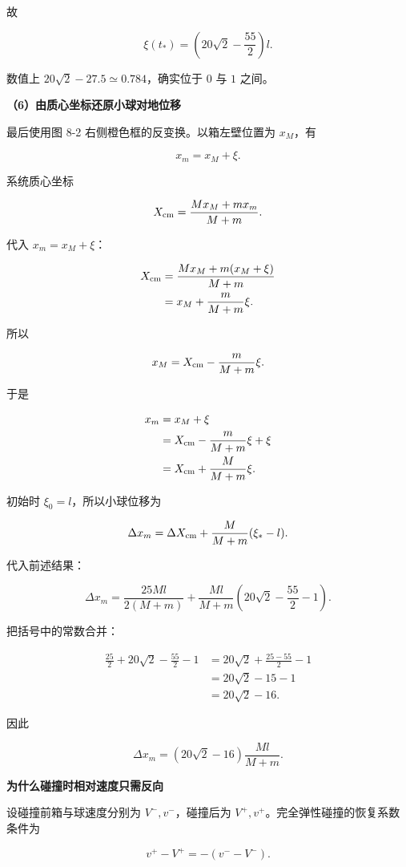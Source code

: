 \documentclass[12pt,a4paper,UTF8]{ctexart}
\begin{document}
故

\[
\boxed{
\xi(t_*)=\left(20\sqrt2-\frac{55}{2}\right)l
}.
\]

数值上 \(20\sqrt2-27.5\simeq0.784\)，确实位于 \(0\) 与 \(1\) 之间。

\textbf{（6）由质心坐标还原小球对地位移}

最后使用图 8-2 右侧橙色框的反变换。以箱左壁位置为 \(x_M\)，有

\[x_m=x_M+\xi.\]

系统质心坐标

\[
X_{\rm cm}=\frac{Mx_M+mx_m}{M+m}.
\]

代入 \(x_m=x_M+\xi\)：

\[
\begin{aligned}
X_{\rm cm}
&=\frac{Mx_M+m(x_M+\xi)}{M+m}\\
&=x_M+\frac{m}{M+m}\xi.
\end{aligned}
\]

所以

\[x_M=X_{\rm cm}-\frac{m}{M+m}\xi.\]

于是

\[
\begin{aligned}
x_m
&=x_M+\xi\\
&=X_{\rm cm}-\frac{m}{M+m}\xi+\xi\\
&=X_{\rm cm}+\frac{M}{M+m}\xi.
\end{aligned}
\]

初始时 \(\xi_0=l\)，所以小球位移为

\[
\Delta x_m=\Delta X_{\rm cm}+\frac{M}{M+m}(\xi_* -l).
\]

代入前述结果：

\[
\Delta x_m
=\frac{25Ml}{2(M+m)}
+\frac{Ml}{M+m}\left(20\sqrt2-\frac{55}{2}-1\right).
\]

把括号中的常数合并：

\[
\begin{aligned}
\frac{25}{2}+20\sqrt2-\frac{55}{2}-1
&=20\sqrt2+\frac{25-55}{2}-1\\
&=20\sqrt2-15-1\\
&=20\sqrt2-16.
\end{aligned}
\]

因此

\[
\boxed{
\Delta x_m=(20\sqrt2-16)\frac{Ml}{M+m}
}.
\]

\textbf{为什么碰撞时相对速度只需反向}

设碰撞前箱与球速度分别为 \(V^-,v^-\)，碰撞后为
\(V^+,v^+\)。完全弹性碰撞的恢复系数条件为

\[v^+-V^+=-(v^--V^-).\]
\end{document}
